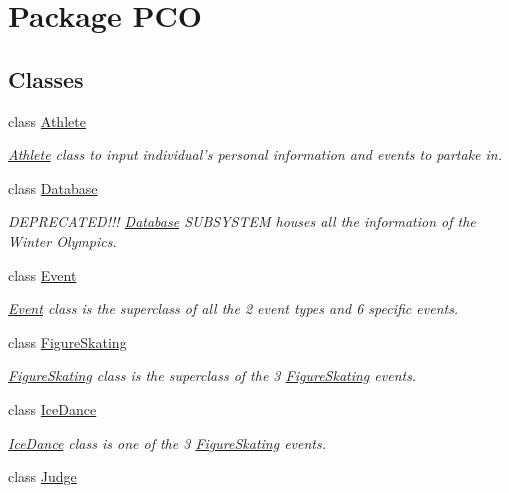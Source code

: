 \hypertarget{namespacePCO}{\section{Package P\+C\+O}
\label{namespacePCO}
}
\subsection*{Classes}
\begin{DoxyCompactItemize}
\item 
class \hyperlink{classPCO_1_1Athlete}{Athlete}
\begin{DoxyCompactList}\small\item\em \hyperlink{classPCO_1_1Athlete}{Athlete} class to input individual's personal information and events to partake in. \end{DoxyCompactList}\item 
class \hyperlink{classPCO_1_1Database}{Database}
\begin{DoxyCompactList}\small\item\em D\+E\+P\+R\+E\+C\+A\+T\+E\+D!!! \hyperlink{classPCO_1_1Database}{Database} S\+U\+B\+S\+Y\+S\+T\+E\+M houses all the information of the Winter Olympics. \end{DoxyCompactList}\item 
class \hyperlink{classPCO_1_1Event}{Event}
\begin{DoxyCompactList}\small\item\em \hyperlink{classPCO_1_1Event}{Event} class is the superclass of all the 2 event types and 6 specific events. \end{DoxyCompactList}\item 
class \hyperlink{classPCO_1_1FigureSkating}{Figure\+Skating}
\begin{DoxyCompactList}\small\item\em \hyperlink{classPCO_1_1FigureSkating}{Figure\+Skating} class is the superclass of the 3 \hyperlink{classPCO_1_1FigureSkating}{Figure\+Skating} events. \end{DoxyCompactList}\item 
class \hyperlink{classPCO_1_1IceDance}{Ice\+Dance}
\begin{DoxyCompactList}\small\item\em \hyperlink{classPCO_1_1IceDance}{Ice\+Dance} class is one of the 3 \hyperlink{classPCO_1_1FigureSkating}{Figure\+Skating} events. \end{DoxyCompactList}\item 
class \hyperlink{classPCO_1_1Judge}{Judge}

\end{DoxyCompactItemize}
